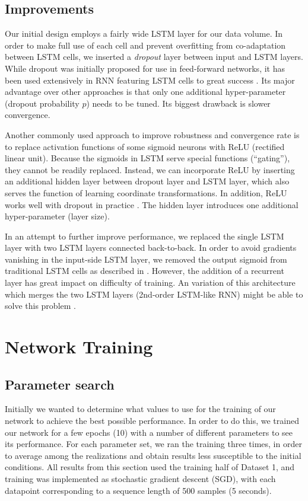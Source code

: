\documentclass{acm_proc_article-sp}
\begin{document}
\subsection{Improvements}

Our initial design employs a fairly wide LSTM layer for our data volume. In order to make full use of each cell and prevent overfitting from co-adaptation between LSTM cells, we inserted a \emph{dropout} \cite{Hinton2012} layer between input and LSTM layers. While dropout was initially proposed for use in feed-forward networks, it has been used extensively in RNN featuring LSTM cells to great success \cite{Pham2013}. Its major advantage over other approaches is that only one additional hyper-parameter (dropout probability $p$) needs to be tuned. Its biggest drawback is slower convergence.

Another commonly used approach to improve robustness and convergence rate is to replace activation functions of some sigmoid neurons with ReLU (rectified linear unit). Because the sigmoids in LSTM serve special functions (``gating''), they cannot be readily replaced. Instead, we can incorporate ReLU by inserting an additional hidden layer between dropout layer and LSTM layer, which also serves the function of learning coordinate transformations. In addition, ReLU works well with dropout in practice \cite{Pham2013,Dahl2013}. The hidden layer introduces one additional hyper-parameter (layer size).

In an attempt to further improve performance, we replaced the single LSTM layer with two LSTM layers connected back-to-back. In order to avoid gradients vanishing in the input-side LSTM layer, we removed the output sigmoid from traditional LSTM cells as described in \cite{Gers2002}. However, the addition of a recurrent layer has great impact on difficulty of training. An variation of this architecture which merges the two LSTM layers (2nd-order LSTM-like RNN) might be able to solve this problem \cite{Monner2012}.

\section{Network Training}
\label{sec:Network Training}

\subsection{Parameter search}
Initially we wanted to determine what values to use for the training of our network to achieve the best possible performance. In order to do this, we trained our network for a few epochs (10) with a  number of different parameters to see its performance.
For each parameter set, we ran the training three times, in order to average among the realizations and obtain results less susceptible to the initial conditions.
All results from this section used the training half of Dataset 1, and training was implemented as stochastic gradient descent (SGD), with each datapoint corresponding to a sequence length of 500 samples (5 seconds).
\end{document}
